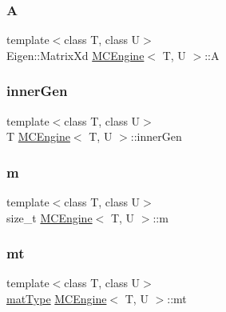 \subsubsection{\texorpdfstring{A}{A}}
{\footnotesize\ttfamily template$<$class T, class U$>$ \\
Eigen\+::\+Matrix\+Xd \hyperlink{classMCEngine}{M\+C\+Engine}$<$ T, U $>$\+::A\hspace{0.3cm}{\ttfamily [protected]}}

\hypertarget{classMCEngine_ae365d3f22ff95cdd7efbd9b555e81a3b}{}\label{classMCEngine_ae365d3f22ff95cdd7efbd9b555e81a3b} 
\subsubsection{\texorpdfstring{inner\+Gen}{innerGen}}
{\footnotesize\ttfamily template$<$class T, class U$>$ \\
T \hyperlink{classMCEngine}{M\+C\+Engine}$<$ T, U $>$\+::inner\+Gen\hspace{0.3cm}{\ttfamily [protected]}}

\hypertarget{classMCEngine_a56d5cb47b251de9dd585af4ce6f32c18}{}\label{classMCEngine_a56d5cb47b251de9dd585af4ce6f32c18} 
\subsubsection{\texorpdfstring{m}{m}}
{\footnotesize\ttfamily template$<$class T, class U$>$ \\
size\+\_\+t \hyperlink{classMCEngine}{M\+C\+Engine}$<$ T, U $>$\+::m\hspace{0.3cm}{\ttfamily [protected]}}

\hypertarget{classMCEngine_a66aed856c87b6ad40107b50e229da831}{}\label{classMCEngine_a66aed856c87b6ad40107b50e229da831} 
\subsubsection{\texorpdfstring{mt}{mt}}
{\footnotesize\ttfamily template$<$class T, class U$>$ \\
\hyperlink{mc__engine_8h_aac1fa89c4c60883790b2adb885048486}{mat\+Type} \hyperlink{classMCEngine}{M\+C\+Engine}$<$ T, U $>$\+::mt\hspace{0.3cm}{\ttfamily [protected]}}

